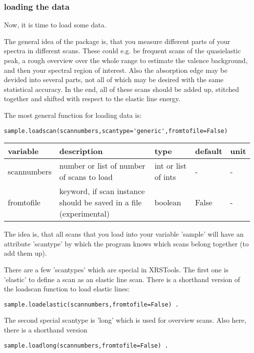 \documentclass[aps,prl,groupedaddress]{revtex4}
\begin{document}
\subsubsection{loading the data}
Now, it is time to load some data. 

The general idea of the package is, that you measure different parts of your spectra in different scans. These could e.g. be frequent scans of the quasielastic peak, a rough overview over the whole range to estimate the valence background, and then your spectral region of interest. Also the absorption edge may be devided into several parts, not all of which may be desired with the same statistical accuracy. In the end, all of these scans should be added up, stitched together and shifted with respect to the elastic line energy.

The most general function for loading data is:

\begin{lstlisting}[frame=single]
sample.loadscan(scannumbers,scantype='generic',fromtofile=False)
\end{lstlisting}

\begin{ruledtabular}
\begin{tabular}{lllll}
variable        & description                                          & type     & default  & unit \\
\hline
scannumbers     & number or list of number of scans to load            & int or list of ints   & -        & -    \\
fromtofile      & keyword, if scan instance should be saved in a file (experimental)  & boolean   & False     & -    \\
\end{tabular}
\end{ruledtabular}

The idea is, that all scans that you load into your variable 'sample' will have an attribute 'scantype' by which the program knows which scans belong together (to add them up).

There are a few 'scantypes' which are special in XRSTools. The first one is 'elastic' to define a scan as an elastic line scan. There is a shorthand version of the loadscan function to load elastic lines:
\begin{lstlisting}[frame=single]
sample.loadelastic(scannumbers,fromtofile=False) .
\end{lstlisting}

The second special scantype is 'long' which is used for overview scans. Also here, there is a shorthand version
\begin{lstlisting}[frame=single]
sample.loadlong(scannumbers,fromtofile=False) .
\end{lstlisting}
\end{document}
